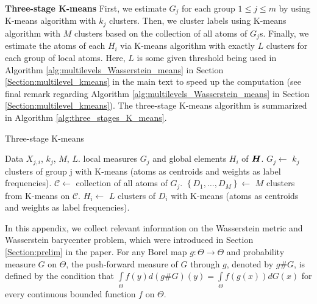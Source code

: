 \textbf{Three-stage K-means}
First, we estimate $G_j$ for each group $1 \leq j \leq m$ by using K-means 
algorithm with $k_{j}$ clusters.
Then, we cluster labels using K-means algorithm with $M$ clusters based on the collection of  all atoms of $G_j$s.
Finally, we estimate the atoms of each $H_i$ via K-means algorithm with exactly $L$ clusters for each 
group of local atoms. Here, $L$ is some given threshold being used in Algorithm \ref{alg:multilevels_Wasserstein_means} in 
Section \ref{Section:multilevel_kmeans} in the main text to speed up the computation (see final remark regarding Algorithm \ref{alg:multilevels_Wasserstein_means} in Section \ref{Section:multilevel_kmeans}). 
The three-stage K-means algorithm is summarized in Algorithm \ref{alg:three_stages_K_means}.
\setcounter{algorithm}{2}
\begin{algorithm}
   \caption{Three-stage K-means}
   \label{alg:three_stages_K_means}
\begin{algorithmic}
    Data $X_{j,i}$, $k_{j}$, $M$, $L$.
    local measures $G_{j}$ and global elements $H_{i}$ of $\boldsymbol{H}$.
   \STATE $G_{j} \leftarrow$ $k_{j}$ clusters of group j with K-means (atoms as centroids and weights as label frequencies).
   \ENDFOR
   	\STATE $\mathcal{C} \leftarrow$ collection of all atoms of $G_{j}$.
   	\STATE $\left\{D_{1},\ldots,D_{M}\right\} \leftarrow$ $M$ clusters from K-means on $\mathcal{C}$.
   \STATE $H_i \leftarrow$ $L$ clusters of $D_i$ with K-means (atoms as centroids and weights as label frequencies).
   \ENDFOR 
\end{algorithmic}
\end{algorithm}

In this appendix, we collect relevant information on the Wasserstein metric and 
Wasserstein barycenter problem, which were introduced in Section \ref{Section:prelim} in the paper. 
For any Borel map $g: \Theta \to \Theta$ and probability measure $G$ on $\Theta$, the 
push-forward measure of $G$ through $g$, denoted by $g\#G$, is defined by the condition
that
$\int \limits_{\Theta}{f(y)}d(g\#G)(y)=\int \limits_{\Theta}{f(g(x))}d G(x)$ for every 
continuous bounded function $f$ on $\Theta$.
